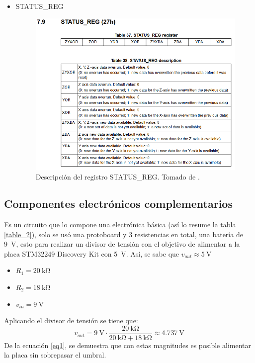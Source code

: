 \begin{itemize}
    \item STATUS\_REG
    \begin{figure}[H]
        \centering
        \includegraphics[width=.7\linewidth]{Imagenes/k3.png}
        \caption{Descripción del registro STATUS\_REG. Tomado de \cite{l3gd20}.}
        \label{fig7}
    \end{figure}
\end{itemize}

\subsection*{Componentes electrónicos complementarios}
Es un circuito que lo compone una electrónica básica (así lo resume la tabla \ref{table_2}), solo se usó una protoboard y 3 resistencias en total, una batería de \SI{9}{\volt}, esto para realizar un divisor de tensión con el objetivo de alimentar a la placa STM32249 Discovery Kit con \SI{5}{\volt}. Así, se sabe que $v_{out} \approx \SI{5}{\volt}$
\begin{itemize}
\item $R_1 = \SI{20}{\kilo\ohm}$
\item $R_2 = \SI{18}{\kilo\ohm}$
\item $v_{in} =  \SI{9}{\volt}$
\end{itemize}
Aplicando el divisor de tensión se tiene que:
\begin{equation}
v_{out} = \SI{9}{\volt} \cdot \frac{  \SI{20}{\kilo\ohm} }{ \SI{20}{\kilo\ohm}+\SI{18}{\kilo\ohm}} \approx \SI{4.737}{\volt}
\label{eq1}
\end{equation}
De la ecuación \ref{eq1}, se demuestra que con estas magnitudes es posible alimentar la placa sin sobrepasar el umbral.

